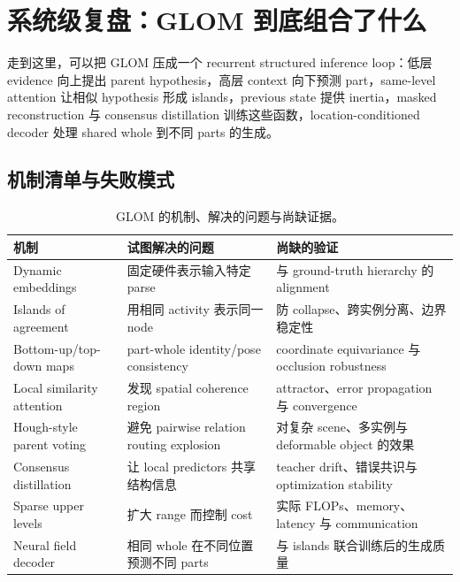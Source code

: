 \section{系统级复盘：GLOM 到底组合了什么}

走到这里，可以把 GLOM 压成一个 recurrent structured inference loop：低层 evidence 向上提出 parent hypothesis，高层 context 向下预测 part，same-level attention 让相似 hypothesis 形成 islands，previous state 提供 inertia，masked reconstruction 与 consensus distillation 训练这些函数，location-conditioned decoder 处理 shared whole 到不同 parts 的生成。


\subsection{机制清单与失败模式}

\begin{table}[H]
\centering
\small
\caption{GLOM 的机制、解决的问题与尚缺证据。}
\begin{tabularx}{\textwidth}{L{0.20\textwidth}L{0.30\textwidth}>{\raggedright\arraybackslash}X}
\toprule
机制 & 试图解决的问题 & 尚缺的验证 \\
\midrule
Dynamic embeddings & 固定硬件表示输入特定 parse & 与 ground-truth hierarchy 的 alignment \\
Islands of agreement & 用相同 activity 表示同一 node & 防 collapse、跨实例分离、边界稳定性 \\
Bottom-up/top-down maps & part-whole identity/pose consistency & coordinate equivariance 与 occlusion robustness \\
Local similarity attention & 发现 spatial coherence region & attractor、error propagation 与 convergence \\
Hough-style parent voting & 避免 pairwise relation routing explosion & 对复杂 scene、多实例与 deformable object 的效果 \\
Consensus distillation & 让 local predictors 共享结构信息 & teacher drift、错误共识与 optimization stability \\
Sparse upper levels & 扩大 range 而控制 cost & 实际 FLOPs、memory、latency 与 communication \\
Neural field decoder & 相同 whole 在不同位置预测不同 parts & 与 islands 联合训练后的生成质量 \\
\bottomrule
\end{tabularx}
\end{table}

